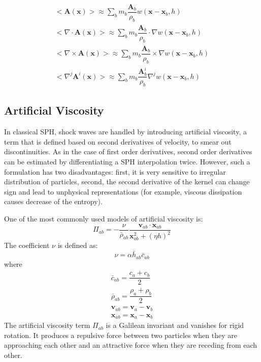\documentclass[gmd, manuscript]{copernicus}
\begin{document}
\begin{align}
<\textbf{A}\left(\textbf{x}\right)> \approx \sum_b m_b \dfrac{\textbf{A}_b}{\rho_b} w\left(\textbf{x}-\textbf{x}_b, h\right) \\
<\nabla \cdot \textbf{A}\left(\textbf{x}\right)> \approx \sum_b m_b \dfrac{\textbf{A}_b}{\rho_b} \cdot \nabla w\left(\textbf{x} - \textbf{x}_b, h\right) \\
<\nabla \times \textbf{A}\left(\textbf{x}\right)> \approx \sum_b m_b \dfrac{\textbf{A}_b}{\rho_b} \times \nabla w\left(\textbf{x} - \textbf{x}_b, h\right) \\
<\nabla^j \textbf{A}^i\left(\textbf{x}\right)> \approx \sum_b m_b \dfrac{\textbf{A}_b^i}{\rho_b} \nabla^j w\left(\textbf{x} - \textbf{x}_b, h\right) 
\label{eq:SPH-vecctor-function}
\end{align}

\subsection{Artificial Viscosity} \label{sec:artificial-viscosity}
In classical SPH, shock waves are handled by introducing artificial viscosity, a term that is defined based on second derivatives of velocity, to smear out discontinuities. As in the case of first order derivatives, second order derivatives can be estimated by differentiating a SPH interpolation twice. However, such a formulation has two disadvantages: first, it is very sensitive to irregular distribution of particles, second, the second derivative of the kernel can change sign and lead to unphysical representations (for example, viscous dissipation causes decrease of the entropy). 

One of the most commonly used models of artificial viscosity \citep{monaghan1983shock} is:
\begin{equation}
\Pi_{ab}=- \frac{\nu}{\bar{\rho}_{ab}} \dfrac{ \textbf{v}_{ab} \cdot \textbf{x}_{ab}}{\textbf{x}_{ab}^2 + \left(\eta h\right)^2}
\label{eq:art-vis-original}
\end{equation}
The coefficient $\nu$ is defined as:
\begin{equation}
\nu = \alpha \bar{h}_{ab} \bar{c}_{ab}
\end{equation}
where 
\begin{align}
\bar{c}_{ab} = \dfrac{c_a + c_b}{2} \\
\bar{\rho}_{ab} = \dfrac{\rho_a + \rho_b}{2} \\
\textbf{v}_{ab}=\textbf{v}_a-\textbf{v}_b \\
\textbf{x}_{ab}=\textbf{x}_a-\textbf{x}_b
\end{align}
The artificial viscosity term $\Pi_{ab}$ is a Galilean invariant and vanishes for rigid rotation. It produces a repulsive force between two particles when they are approaching each other and an attractive force when they are receding from each other. 
\end{document}
